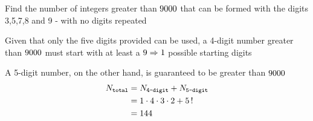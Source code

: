 



\question[2] Find the number of integers greater than $9000$ that can be formed with the digits 3,5,7,8 and 9 - with
 no digits repeated


\watchout

\ifprintanswers
\fi 

\begin{solution}[\mcq]
	Given that only the five digits provided can be used, a 4-digit number greater than $9000$ must start 
  with at least a $9 \Rightarrow 1$ possible starting digits

	A 5-digit number, on the other hand, is guaranteed to be greater than $9000$
	\begin{align}
		N_{\texttt{total}} &= N_{\texttt{4-digit}} + N_{\texttt{5-digit}} \\
		   &= 1\cdot 4\cdot 3 \cdot 2 + 5\,! \\
		   &= 144
	\end{align}
\end{solution}
